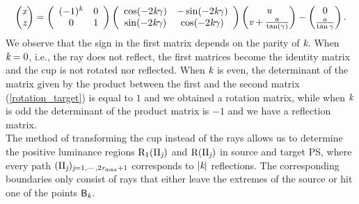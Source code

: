 \begin{equation} \label{rotation_target}\begin{pmatrix} \textit{x}\\ \textit{z}
\end{pmatrix} = \left(\begin{array}{cc}(-1)^k & 0  \\ 0 & 1\end{array}\right)
\left(\begin{array}{cc}\cos(-2\textit{k}\gamma) & -\sin(-2\textit{k}\gamma) \\\sin(-2\textit{k}\gamma) & \cos(-2\textit{k}\gamma)\end{array}\right)\begin{pmatrix} \textit{u} \\
 \textit{v}+\frac{a}{\tan(\gamma)}\end{pmatrix}-\begin{pmatrix}0 \\ \frac{a}{\tan\gamma}\end{pmatrix}.
\end{equation} We observe that the sign in the first matrix depends on the parity of $\textit{k}$. When $\textit{k}=0$, i.e., the ray does not reflect, the first matrices become the identity matrix and the cup is not rotated nor reflected. When $\textit{k}$ is even, the determinant of the matrix given by the product between the first and the second matrix (\ref{rotation_target}) is equal to $1$ and we obtained a rotation matrix, while when $\textit{k}$ is odd the determinant of the product matrix is $-1$ and we have a reflection matrix.
\\ \indent
The method of transforming the cup instead of the rays allows us to determine the positive luminance regions $\mbox{$\textup{R}$}_1(\Pi_{\textit{j}})$ and $\mbox{$\textup{R}$}(\Pi_{\textit{j}})$ in source and target PS, where every path $(\Pi_{\textit{j}})_{\textit{j}=1, \cdots, 2\textit{r}_{\textrm{max}}+1}$ corresponds to $|\textit{k}|$ reflections. The corresponding boundaries only consist of rays that either leave the extremes of the source or hit one of the points $\textsf{B}_{\textit{k}}$. 


